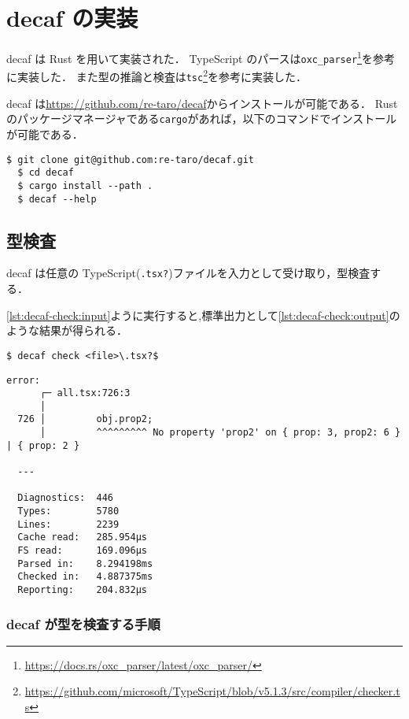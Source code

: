 \chapter{decaf の実装}

decaf は Rust を用いて実装された．
TypeScript のパースは\texttt{oxc\_parser}\footnote{\url{https://docs.rs/oxc_parser/latest/oxc_parser/}}を参考に実装した．
また型の推論と検査は\texttt{tsc}\footnote{\url{https://github.com/microsoft/TypeScript/blob/v5.1.3/src/compiler/checker.ts}}を参考に実装した．

decaf は\url{https://github.com/re-taro/decaf}からインストールが可能である．
Rust のパッケージマネージャである\texttt{cargo}があれば，以下のコマンドでインストールが可能である．

\begin{lstlisting}[caption=decaf のインストール]
  $ git clone git@github.com:re-taro/decaf.git
  $ cd decaf
  $ cargo install --path .
  $ decaf --help
\end{lstlisting}

\section{型検査}

decaf は任意の TypeScript(\texttt{.tsx?})ファイルを入力として受け取り，型検査する．

\ref{lst:decaf-check:input}ように実行すると,標準出力として\ref{lst:decaf-check:output}のような結果が得られる．

\begin{lstlisting}[caption=decaf の型検査, label=lst:decaf-check:input]
  $ decaf check <file>\.tsx?$
\end{lstlisting}

\begin{lstlisting}[caption=decaf の型検査結果, label=lst:decaf-check:output]
  error:
      ┌─ all.tsx:726:3
      │
  726 │         obj.prop2;
      │         ^^^^^^^^^ No property 'prop2' on { prop: 3, prop2: 6 } | { prop: 2 }

  ---

  Diagnostics:	446
  Types:      	5780
  Lines:      	2239
  Cache read: 	285.954µs
  FS read:    	169.096µs
  Parsed in:  	8.294198ms
  Checked in: 	4.887375ms
  Reporting:  	204.832µs
\end{lstlisting}

\subsection{decaf が型を検査する手順}

